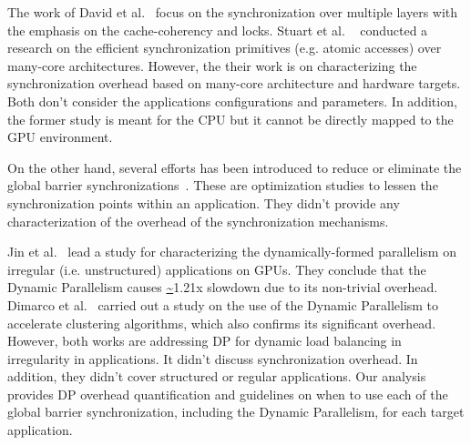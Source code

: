 \documentclass[conference]{IEEEtran}
\begin{document}
The work of David et al.~\cite{proc11} focus on the synchronization over multiple layers with the emphasis on the cache-coherency and locks. Stuart et al. ~\cite{proc16} conducted a research on the efficient synchronization primitives (e.g. atomic accesses) over many-core architectures. However, the their work is on characterizing the synchronization overhead based on many-core architecture and hardware targets. Both don't consider the applications configurations and parameters. In addition, the former study is meant for the CPU but it cannot be directly mapped to the GPU environment. 

On the other hand, several efforts has been introduced to reduce or eliminate the global barrier synchronizations~\cite{proc14,proc15,proc17}. These are optimization studies to lessen the synchronization points within an application. They didn't provide any characterization of the overhead of the synchronization mechanisms.  

Jin et al.~\cite{proc4} lead a study for characterizing the dynamically-formed parallelism on irregular (i.e. unstructured) applications on GPUs. They conclude that the Dynamic Parallelism causes \url{~}1.21x slowdown due to its non-trivial overhead. Dimarco et al.~\cite{proc3} carried out a study on the use of the Dynamic Parallelism to accelerate clustering algorithms, which also confirms its significant overhead. However, both works are addressing DP for dynamic load balancing in irregularity in applications. It didn't discuss synchronization overhead. In addition, they didn't cover structured or regular applications. Our analysis provides DP overhead quantification and guidelines on when to use each of the global barrier synchronization, including the Dynamic Parallelism, for each target application.  
\end{document}
